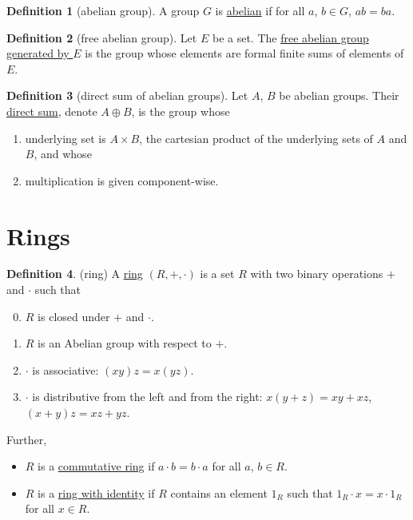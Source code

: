 \documentclass[a4paper,10pt]{scrreprt}
\newcommand{\defn}[1]{\ul{#1}}
\theoremstyle{definition}
\newtheorem{definition}{Definition}[section]
\theoremstyle{plain}
\theoremstyle{remark}
\begin{document}
\begin{definition}[abelian group]
  \label{def:abeliangroup}
  A group $G$ is \defn{abelian} if for all $a$, $b \in G$, $ab=ba$.
\end{definition}

\begin{definition}[free abelian group]
  \label{def:freeabeliangroup}
  Let $E$ be a set. The \defn{free abelian group generated by $E$} is the group whose elements are formal finite sums of elements of $E$.
\end{definition}

\begin{definition}[direct sum of abelian groups]
  \label{def:directsumofabeliangroup}
  Let $A$, $B$ be abelian groups. Their \defn{direct sum}, denote $A \oplus B$, is the group whose
  \begin{enumerate}
    \item underlying set is $A \times B$, the cartesian product of the underlying sets of $A$ and $B$, and whose

    \item multiplication is given component-wise.
  \end{enumerate}
\end{definition}
\section{Rings}

\begin{definition}(ring)
  \label{def:ring}
  A \defn{ring} $(R, +, \cdot )$ is a set $R$ with two binary operations $+$ and $\cdot $ such that
  \begin{enumerate}
      \setcounter{enumi}{-1}
    \item $R$ is closed under $+$ and $\cdot$.
    \item $R$ is an Abelian group with respect to $+$.
    \item $\cdot$ is associative: $(xy)z = x(yz)$.
    \item $\cdot$ is distributive from the left and from the right: $x(y+z) = xy + xz$, $(x+y)z = xz + yz$.
  \end{enumerate}

  Further,
  \begin{itemize}
    \item $R$ is a \defn{commutative ring} if $a\cdot b = b \cdot a$ for all $a$, $b \in R$.
    \item $R$ is a \defn{ring with identity} if $R$ contains an element $1_{R}$ such that $1_{R}\cdot  x = x\cdot 1_{R}$ for all $x \in R$.
  \end{itemize}
\end{definition}
\end{document}
